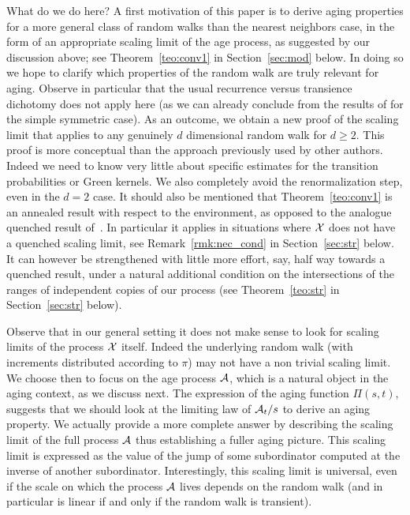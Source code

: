 What do we do here? 
A first motivation of this paper is to derive aging properties for a more general class of random walks 
than the nearest neighbors case, in the form of an appropriate scaling limit of the age process, as suggested by our discussion above; 
see Theorem~\ref{teo:conv1} in Section~\ref{sec:mod} below. 
In doing so we hope to clarify which properties of the random walk are 
truly relevant for aging. Observe in particular that the usual recurrence versus transience dichotomy does not apply here 
 (as we can already conclude from the results of \cite{kn:AC1} for the simple symmetric case). 
As an outcome, we obtain a new proof of the scaling limit that applies to any genuinely $d$ dimensional 
random walk for $d\geq 2$. This proof is more conceptual than the approach previously used by other authors. 
Indeed we need to know very little about specific estimates for the transition probabilities or Green kernels. 
We also completely avoid the renormalization step, even in the $d=2$ case. It should also be mentioned that 
 Theorem~\ref{teo:conv1} is an annealed result with respect to the environment, as 
opposed to the analogue quenched result of~\cite{kn:AC1}. 
In particular it applies in situations where ${\cal X}$ does not have a quenched scaling limit,
see Remark~\ref{rmk:nec_cond} in Section~\ref{sec:str} below.  
It can however be strengthened  with little more effort, say, half way towards a quenched 
result, under a natural additional condition on the intersections of the ranges of independent copies of our process
(see Theorem~\ref{teo:str} in Section~\ref{sec:str} below).

Observe that in our general setting it does not make sense to look for scaling limits of the process ${\cal X}$ 
itself. Indeed the underlying random walk (with increments distributed according to $\pi$) may not have a 
non trivial scaling limit. 
 We choose then to focus on the age process ${\cal A}$, which is a natural object in the aging context, as we discuss next.
The expression of the aging function $\Pi(s,t)$, suggests that we should look at the limiting law 
of ${\cal A}_t/s$ to derive  an aging property. We actually provide a more complete answer by describing the 
scaling limit of the full process ${\cal A}$ thus establishing a fuller aging picture. 
This scaling limit is expressed as the value of the jump of 
some subordinator computed at the inverse of another subordinator. 
Interestingly, this scaling limit is universal, even if the scale on which the process ${\cal A}$ lives depends 
on the random walk (and in particular is linear if and only if the random walk is transient). 

